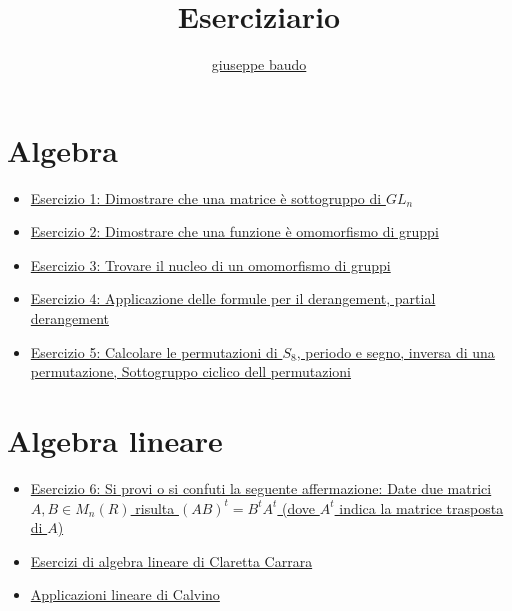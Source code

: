 \documentclass[a4paper,10pt]{article}
\title{Eserciziario}
\author{\href{http://www.baudo.hol.es}{giuseppe baudo}}
\begin{document}
\maketitle

\section{Algebra}
\begin{itemize}
 \item \href{./esercizio1.html}{Esercizio 1: Dimostrare che una matrice è sottogruppo di $GL_{n}$}
 \item \href{./esercizio2.html}{Esercizio 2: Dimostrare che una funzione è omomorfismo di gruppi}
 \item \href{./esercizio3.html}{Esercizio 3: Trovare il nucleo di un omomorfismo di gruppi}
 \item \href{./esercizio4.html}{Esercizio 4: Applicazione delle formule per il derangement, partial derangement}
 \item \href{./esercizio5.html}{Esercizio 5: Calcolare le permutazioni di $S_{8}$, periodo e segno, inversa di una permutazione, Sottogruppo ciclico dell permutazioni}
\end{itemize}

\section{Algebra lineare}
\begin{itemize}
 \item \href{./esercizio6.html}{Esercizio 6: Si provi o si confuti la seguente affermazione: Date due matrici $A, B \in M_n(R)$ risulta $(AB)^t = B^tA^t$ (dove $A^t$ indica la matrice trasposta di $A$)}
 \item \href{../book/AlgebraLineare/}{Esercizi di algebra lineare di Claretta Carrara}
 \item \href{../book/AlgebraLineare/}{Applicazioni lineare di Calvino}
\end{itemize}
\end{document}
